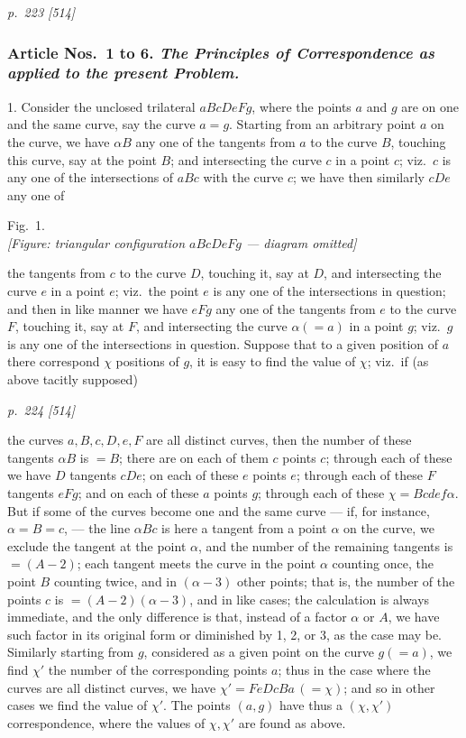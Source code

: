 \documentclass[11pt,a4paper]{book}
\begin{document}
\bigskip
\textit{p.~223 [514]}
\smallskip

\subsubsection*{Article Nos.\ 1 to 6.  \textit{The Principles of Correspondence as applied to the present Problem.}}

1. Consider the unclosed trilateral $aBcDeFg$, where the points $a$ and $g$ are on
one and the same curve, say the curve $a=g$.  Starting from an arbitrary point $a$ on
the curve, we have $\alpha B$ any one of the tangents from $a$ to the curve $B$, touching this
curve, say at the point $B$; and intersecting the curve $c$ in a point $c$; viz.\ $c$ is any one
of the intersections of $aBc$ with the curve $c$; we have then similarly $cDe$ any one of

\begin{center}
Fig.\ 1.\\
\textit{[Figure: triangular configuration $aBcDeFg$ --- diagram omitted]}
\end{center}

the tangents from $c$ to the curve $D$, touching it, say at $D$, and intersecting the curve $e$
in a point $e$; viz.\ the point $e$ is any one of the intersections in question; and then
in like manner we have $eFg$ any one of the tangents from $e$ to the curve $F$, touching
it, say at $F$, and intersecting the curve $\alpha (=a)$ in a point $g$; viz.\ $g$ is any one of
the intersections in question.  Suppose that to a given position of $a$ there correspond
$\chi$ positions of $g$, it is easy to find the value of $\chi$; viz.\ if (as above tacitly supposed)

\clearpage

\bigskip
\textit{p.~224 [514]}
\smallskip

the curves $a, B, c, D, e, F$ are all distinct curves, then the number of these
tangents $\alpha B$ is $=B$; there are on each of them $c$ points $c$; through each of these
we have $D$ tangents $cDe$; on each of these $e$ points $e$; through each of these
$F$ tangents $eFg$; and on each of these $a$ points $g$; through each of these $\chi=Bcdef\alpha$.  But if some
of the curves become one and the same curve --- if, for instance, $\alpha=B=c$, --- the line
$\alpha Bc$ is here a tangent from a point $\alpha$ on the curve, we exclude the tangent at the
point $\alpha$, and the number of the remaining tangents is $=(A-2)$; each tangent meets
the curve in the point $\alpha$ counting once, the point $B$ counting twice, and in $(\alpha-3)$
other points; that is, the number of the points $c$ is $=(A-2)(\alpha-3)$, and in like
cases; the calculation is always immediate, and the only difference is that, instead of
a factor $\alpha$ or $A$, we have such factor in its original form or diminished by 1, 2,
or 3, as the case may be.  Similarly starting from $g$, considered as a given point on
the curve $g(=a)$, we find $\chi'$ the number of the corresponding points $a$; thus in the
case where the curves are all distinct curves, we have $\chi'=FeDcBa\, (=\chi)$; and so in
other cases we find the value of $\chi'$.  The points $(a, g)$ have thus a $(\chi, \chi')$ correspondence, where the values of $\chi, \chi'$ are found as above.
\end{document}

